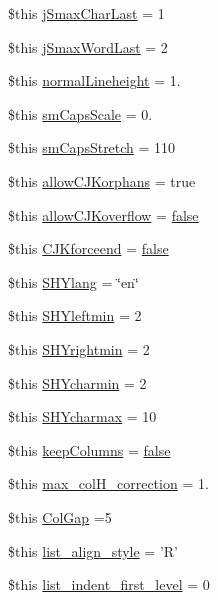 \begin{DoxyCompactItemize}
\item 
\$this \hyperlink{config_8php_a88fd206d3a2da230f861d6f1f376a5c5}{j\-Smax\-Char\-Last} = 1
\item 
\$this \hyperlink{config_8php_a539b9f697ec4e5a0e8c753d79f90c02a}{j\-Smax\-Word\-Last} = 2
\item 
\$this \hyperlink{config_8php_af31b370a8cbad4623439f77426b157b3}{normal\-Lineheight} = 1.
\item 
\$this \hyperlink{config_8php_ae2537b17eb881748faa8462abb132325}{sm\-Caps\-Scale} = 0.
\item 
\$this \hyperlink{config_8php_a93513ac3a0910cbbffea558bc5ceb8cb}{sm\-Caps\-Stretch} = 110
\item 
\$this \hyperlink{config_8php_ac3c778769cee991acbddda70d97d2d05}{allow\-C\-J\-Korphans} = true
\item 
\$this \hyperlink{config_8php_a4fe056d3dd16ea78955159e107a42a63}{allow\-C\-J\-Koverflow} = \hyperlink{ttfontsuni_8php_afbaa04e5cc97693dc668b3c45d3dd740}{false}
\item 
\$this \hyperlink{config_8php_a115d273cc993d144d858469bfb34d1f5}{C\-J\-Kforceend} = \hyperlink{ttfontsuni_8php_afbaa04e5cc97693dc668b3c45d3dd740}{false}
\item 
\$this \hyperlink{config_8php_a9ac72428ad1d3fa35e199e8ba0b84146}{S\-H\-Ylang} = \char`\"{}en\char`\"{}
\item 
\$this \hyperlink{config_8php_aec90f2a0f4bcff8d49295731fc0c5214}{S\-H\-Yleftmin} = 2
\item 
\$this \hyperlink{config_8php_a172dce8fad0eeaca6e6eb0e1d3c7940e}{S\-H\-Yrightmin} = 2
\item 
\$this \hyperlink{config_8php_a43edd6f70c2c8cd13c33184f79a190e2}{S\-H\-Ycharmin} = 2
\item 
\$this \hyperlink{config_8php_a876c55bc73fb60df32bb171cae3ee487}{S\-H\-Ycharmax} = 10
\item 
\$this \hyperlink{config_8php_aee7c7fc30389606b37f82320b90ee518}{keep\-Columns} = \hyperlink{ttfontsuni_8php_afbaa04e5cc97693dc668b3c45d3dd740}{false}
\item 
\$this \hyperlink{config_8php_aefb357428922f87374af6e3ece669508}{max\-\_\-col\-H\-\_\-correction} = 1.
\item 
\$this \hyperlink{config_8php_a1884843eec16d69bb53b46c8db0201f5}{Col\-Gap} =5
\item 
\$this \hyperlink{config_8php_ac1485101227c51b6c239bc7a6181b27c}{list\-\_\-align\-\_\-style} = 'R'
\item 
\$this \hyperlink{config_8php_a41fb70fe30e7c6d2f58596cc1cf663c7}{list\-\_\-indent\-\_\-first\-\_\-level} = 0

\end{DoxyCompactItemize}
